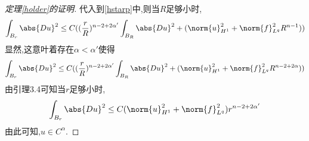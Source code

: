 \begin{proof}[定理\eqref{holder}的证明]
    代入到\eqref{hstarp}中,则当$R$足够小时,
    \begin{equation}
        \int_{B_r}\abs{Du}^2 \le C((\frac{r}{R})^{n-2+2\alpha'}\int_{B_R}\abs{Du}^2 + (\norm{u}^2_{H^1}+\norm{f}^2_{L^q}R^{n-1}))
    \end{equation}
    显然,这意叶着存在$\alpha < \alpha'$使得
    \begin{equation}
        \int_{B_r}\abs{Du}^2 \le C((\frac{r}{R})^{n-2+2\alpha'}\int_{B_R}\abs{Du}^2 + (\norm{u}^2_{H^1}+\norm{f}^2_{L^q}R^{n-2+2\alpha}))
    \end{equation}
    由引理3.4可知当$r$足够小时,
    \begin{equation}
        \int_{B_r}\abs{Du}^2 \le C(\norm{u}^2_{H^1} + \norm{f}^2_{L^q})r^{n-2+2\alpha'}
    \end{equation}
    由此可知,$u \in C^\alpha$.
\end{proof}
